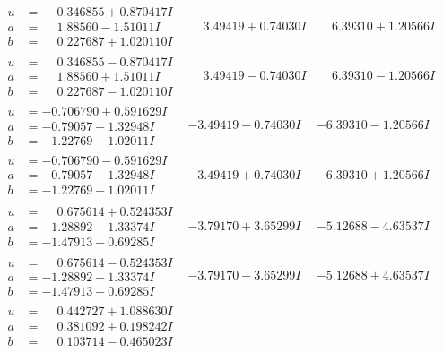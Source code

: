 \documentclass[1p]{elsarticle_modified}
\theoremstyle{definition}
\begin{document}
$$\begin{array}{c|c|c}
\begin{aligned}
u &= \phantom{-}0.346855 + 0.870417 I \\
a &= \phantom{-}1.88560 - 1.51011 I \\
b &= \phantom{-}0.227687 + 1.020110 I\end{aligned}
 & \phantom{-}3.49419 + 0.74030 I & \phantom{-}6.39310 + 1.20566 I \\ \hline\begin{aligned}
u &= \phantom{-}0.346855 - 0.870417 I \\
a &= \phantom{-}1.88560 + 1.51011 I \\
b &= \phantom{-}0.227687 - 1.020110 I\end{aligned}
 & \phantom{-}3.49419 - 0.74030 I & \phantom{-}6.39310 - 1.20566 I \\ \hline\begin{aligned}
u &= -0.706790 + 0.591629 I \\
a &= -0.79057 - 1.32948 I \\
b &= -1.22769 - 1.02011 I\end{aligned}
 & -3.49419 - 0.74030 I & -6.39310 - 1.20566 I \\ \hline\begin{aligned}
u &= -0.706790 - 0.591629 I \\
a &= -0.79057 + 1.32948 I \\
b &= -1.22769 + 1.02011 I\end{aligned}
 & -3.49419 + 0.74030 I & -6.39310 + 1.20566 I \\ \hline\begin{aligned}
u &= \phantom{-}0.675614 + 0.524353 I \\
a &= -1.28892 + 1.33374 I \\
b &= -1.47913 + 0.69285 I\end{aligned}
 & -3.79170 + 3.65299 I & -5.12688 - 4.63537 I \\ \hline\begin{aligned}
u &= \phantom{-}0.675614 - 0.524353 I \\
a &= -1.28892 - 1.33374 I \\
b &= -1.47913 - 0.69285 I\end{aligned}
 & -3.79170 - 3.65299 I & -5.12688 + 4.63537 I \\ \hline\begin{aligned}
u &= \phantom{-}0.442727 + 1.088630 I \\
a &= \phantom{-}0.381092 + 0.198242 I \\
b &= \phantom{-}0.103714 - 0.465023 I\end{aligned}

\end{array}$$
\end{document}
